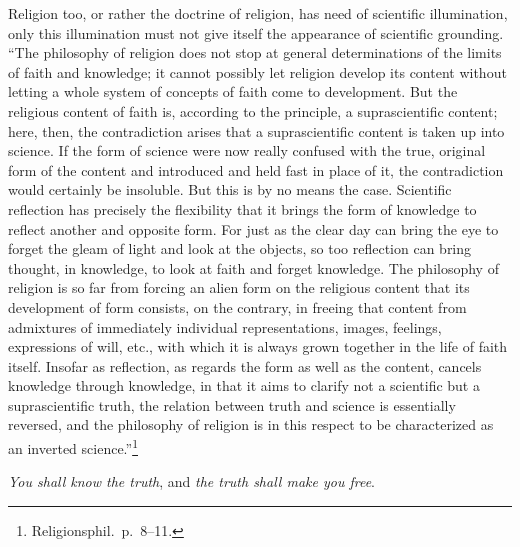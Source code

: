 \documentclass[12pt,a4paper]{article}
\newcommand{\opage}[1]{\marginnote{\footnotesize\textit{[#1]}}}
\begin{document}
Religion too, or rather the doctrine of religion, has need of
scientific illumination, only this illumination must not give itself the
appearance of scientific grounding. ``The philosophy of religion does not
stop at general determinations of the limits of faith and knowledge; it
cannot possibly let religion develop its content without letting a whole
system of concepts of faith come to development. But the religious
content of faith is, according to the principle, a suprascientific
content; here, then, the contradiction arises that a suprascientific
content is taken up into science. If the form of science were now really
confused with the true, original form of the content and introduced and
held fast in place of it, the contradiction would certainly be
insoluble. But this is by no means the case. Scientific reflection has
precisely the
\opage{55}flexibility that it brings the form of knowledge to reflect another and
opposite form. For just as the clear day can bring the eye to forget the
gleam of light and look at the objects, so too reflection can bring
thought, in knowledge, to look at faith and forget knowledge. The
philosophy of religion is so far from forcing an alien form on the
religious content that its development of form consists, on the
contrary, in freeing that content from admixtures of immediately
individual representations, images, feelings, expressions of will, etc.,
with which it is always grown together in the life of faith itself.
Insofar as reflection, as regards the form as well as the content,
cancels knowledge through knowledge, in that it aims to clarify not a
scientific but a suprascientific truth, the relation between truth and
science is essentially reversed, and the philosophy of religion is in
this respect to be characterized as an inverted
science.''\footnote{Religionsphil.\ p.\ 8--11.} %

\emph{You shall know the truth}, and \emph{the truth shall make you
free}.
\end{document}
